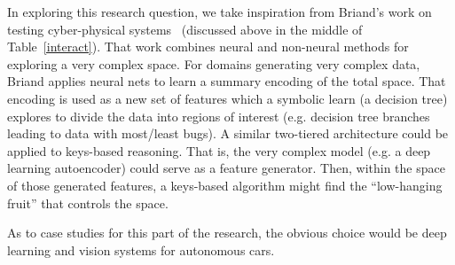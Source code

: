 In exploring this research question,  we take inspiration from Briand's
work on testing cyber-physical  systems~\cite{Abdessalem18}
(discussed above in the middle of Table~\ref{interact}). That work combines neural
and non-neural methods for exploring a very complex space.
For domains generating very complex data, Briand applies neural nets to learn a summary encoding of the total space. That encoding is used
as a new set of features which a symbolic learn (a decision tree) explores to divide the data into regions of interest (e.g. decision tree
branches leading to data with most/least bugs).
A similar two-tiered architecture could be applied to keys-based reasoning. That is, the very complex model
(e.g. a deep learning autoencoder) could serve as a feature generator. Then, within the space of those generated features, a keys-based
algorithm might find the ``low-hanging fruit'' that controls the space.

As to case studies for this part of the research, the obvious choice
would be deep learning and vision systems for autonomous cars. 




  



